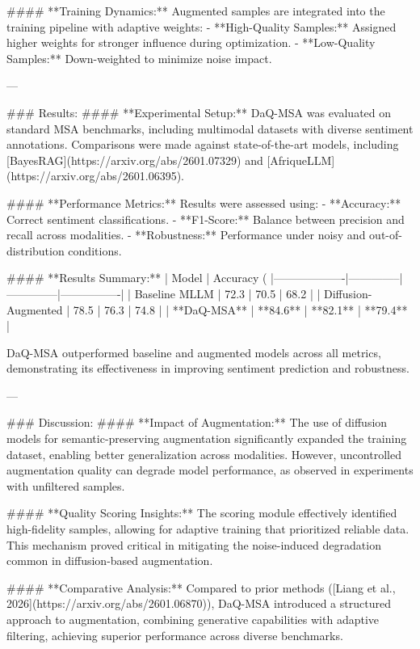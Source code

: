 #### **Training Dynamics:**
Augmented samples are integrated into the training pipeline with adaptive weights:
- **High-Quality Samples:** Assigned higher weights for stronger influence during optimization.
- **Low-Quality Samples:** Down-weighted to minimize noise impact.

---

### Results:
#### **Experimental Setup:**
DaQ-MSA was evaluated on standard MSA benchmarks, including multimodal datasets with diverse sentiment annotations. Comparisons were made against state-of-the-art models, including [BayesRAG](https://arxiv.org/abs/2601.07329) and [AfriqueLLM](https://arxiv.org/abs/2601.06395).

#### **Performance Metrics:**
Results were assessed using:
- **Accuracy:** Correct sentiment classifications.
- **F1-Score:** Balance between precision and recall across modalities.
- **Robustness:** Performance under noisy and out-of-distribution conditions.

#### **Results Summary:**
| Model            | Accuracy (%
|-------------------|--------------|--------------|----------------|
| Baseline MLLM    | 72.3         | 70.5         | 68.2           |
| Diffusion-Augmented | 78.5         | 76.3         | 74.8           |
| **DaQ-MSA**       | **84.6**     | **82.1**     | **79.4**       |

DaQ-MSA outperformed baseline and augmented models across all metrics, demonstrating its effectiveness in improving sentiment prediction and robustness.

---

### Discussion:
#### **Impact of Augmentation:**
The use of diffusion models for semantic-preserving augmentation significantly expanded the training dataset, enabling better generalization across modalities. However, uncontrolled augmentation quality can degrade model performance, as observed in experiments with unfiltered samples.

#### **Quality Scoring Insights:**
The scoring module effectively identified high-fidelity samples, allowing for adaptive training that prioritized reliable data. This mechanism proved critical in mitigating the noise-induced degradation common in diffusion-based augmentation.

#### **Comparative Analysis:**
Compared to prior methods ([Liang et al., 2026](https://arxiv.org/abs/2601.06870)), DaQ-MSA introduced a structured approach to augmentation, combining generative capabilities with adaptive filtering, achieving superior performance across diverse benchmarks.

